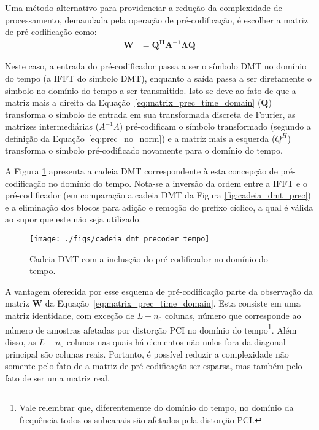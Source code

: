 Uma método alternativo para providenciar a redução da complexidade de processamento, demandada pela operação de pré-codificação, é escolher a matriz de pré-codificação como:
\begin{align}
\mathbf{W} &= \mathbf{Q^H A^{-1} \Lambda Q}
\label{eq:matrix_prec_time_domain}
\end{align}
 
Neste caso, a entrada do pré-codificador passa a ser o símbolo DMT no domínio do tempo (a IFFT do símbolo DMT), enquanto a saída passa a ser diretamente o símbolo no domínio do tempo a ser transmitido. Isto se deve ao fato de que a matriz mais a direita da Equação~\ref{eq:matrix_prec_time_domain} ($\mathbf{Q}$) transforma o símbolo de entrada em sua transformada discreta de Fourier, as matrizes intermediárias ($A^{-1} \Lambda$) pré-codificam o símbolo transformado (segundo a definição da Equação~\ref{eq:prec_no_norm}) e a matriz mais a esquerda ($Q^H$) transforma o símbolo pré-codificado novamente para o domínio do tempo. 

A Figura \ref{fig:cadeia_dmt_prec_tempo} apresenta a cadeia DMT correspondente à esta concepção de pré-codificação no domínio do tempo. Nota-se a inversão da ordem entre a IFFT e o pré-codificador (em comparação a cadeia DMT da Figura \ref{fig:cadeia_dmt_prec}) e a eliminação dos blocos para adição e remoção do prefixo cíclico, a qual é válida ao supor que este não seja utilizado.

\begin{figure}[htbp]
\centering
\texttt{[image: ./figs/cadeia\_dmt\_precoder\_tempo]}
\caption{Cadeia DMT com a inclusção do pré-codificador no domínio do tempo.
\label{fig:cadeia_dmt_prec_tempo}}
\end{figure}

A vantagem oferecida por esse esquema de pré-codificação parte da observação da matriz $\mathbf{W}$ da Equação~\ref{eq:matrix_prec_time_domain}. Esta consiste em uma matriz identidade, com exceção de $L - n_0$ colunas, número que corresponde ao número de amostras afetadas por distorção PCI no domínio do tempo\footnote{Vale relembrar que, diferentemente do domínio do tempo, no domínio da frequência todos os subcanais são afetados pela distorção PCI.}. Além disso, as $L - n_0$ colunas nas quais há elementos não nulos fora da diagonal principal são colunas reais. Portanto, é possível reduzir a complexidade não somente pelo fato de a matriz de pré-codificação ser esparsa, mas também pelo fato de ser uma matriz real.

